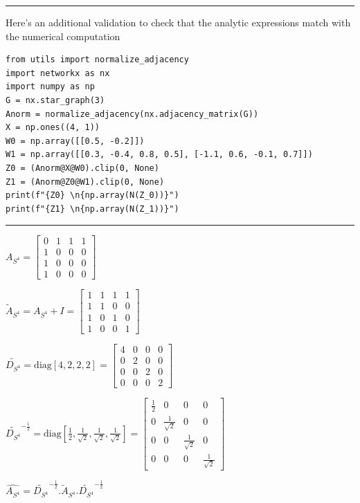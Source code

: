 \documentclass[a4paper]{article}
\begin{document}
\hrule
Here's an additional validation to check that the analytic expressions match with the numerical computation
\begin{verbatim}
from utils import normalize_adjacency
import networkx as nx
import numpy as np
G = nx.star_graph(3)
Anorm = normalize_adjacency(nx.adjacency_matrix(G))
X = np.ones((4, 1))
W0 = np.array([[0.5, -0.2]])
W1 = np.array([[0.3, -0.4, 0.8, 0.5], [-1.1, 0.6, -0.1, 0.7]])
Z0 = (Anorm@X@W0).clip(0, None)
Z1 = (Anorm@Z0@W1).clip(0, None)
print(f"{Z0} \n{np.array(N(Z_0))}")
print(f"{Z1} \n{np.array(N(Z_1))}")
\end{verbatim}
\hrule
    
$ A_{S^4} = \begin{bmatrix}
    0  &  1  &  1  &  1 \\
    1  &  0  &  0  &  0 \\
    1  &  0  &  0  &  0 \\
    1  &  0  &  0  &  0 
\end{bmatrix}
$

$\tilde{A}_{S^4} = A_{S^4} + I = \begin{bmatrix}
    1  &  1  &  1  &  1 \\
    1  &  1  &  0  &  0 \\
    1  &  0  &  1  &  0 \\
    1  &  0  &  0  &  1 
  \end{bmatrix}
$

$ \tilde{D_{S^4}} = \text{diag}[4, 2, 2, 2] = \begin{bmatrix}
    4  &  0  &  0  &  0 \\
    0  &  2  &  0  &  0 \\
    0  &  0  &  2  &  0 \\
    0  &  0  &  0  &  2 
\end{bmatrix}$


$\tilde{D_{S^4}}^{-\frac{1}{2}} = \text{diag}[\frac{1}{2}, \frac{1}{\sqrt{2}}, \frac{1}{\sqrt{2}}, \frac{1}{\sqrt{2}}] = 
\begin{bmatrix}
    \frac{1}{2}  &  0  &  0  &  0 \\
    0  &  \frac{1}{\sqrt{2}}  &  0  &  0 \\
    0  &  0  &  \frac{1}{\sqrt{2}}  &  0 \\
    0  &  0  &  0  &  \frac{1}{\sqrt{2}} 
\end{bmatrix}$


$\hat{A_{S^4}} = \tilde{D_{S^4}}^{-\frac{1}{2}} .\tilde{A}_{S^4} .\tilde{D_{S^4}}^{-\frac{1}{2}} $
\end{document}
